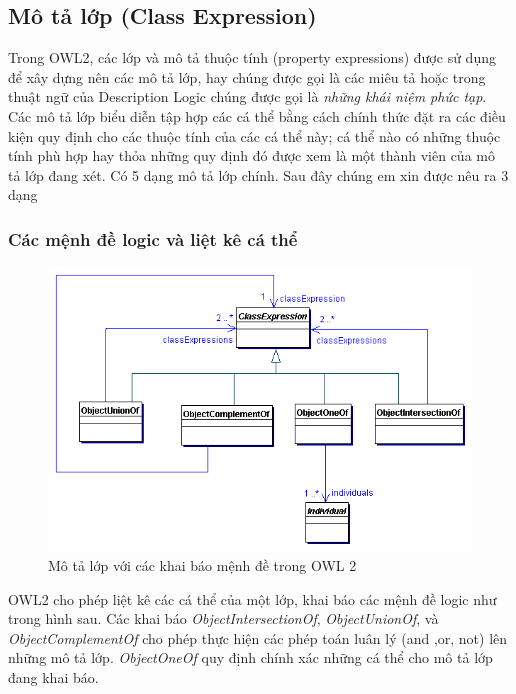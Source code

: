 \subsection{Mô tả lớp (Class Expression)}
Trong OWL2, các lớp và mô tả thuộc tính (property expressions) được sử dụng để xây dựng nên các mô tả lớp, hay chúng được gọi là các miêu tả hoặc trong thuật ngữ của Description Logic chúng được gọi là \textit{những khái niệm phức tạp}. Các mô tả lớp 
biểu diễn tập hợp các cá thể bằng cách chính thức đặt ra các điều kiện quy định cho các thuộc tính của các cá thể này; cá thể nào có những thuộc tính phù hợp hay thỏa những quy định đó được xem là một thành viên của mô tả lớp đang xét. Có 5 dạng mô tả lớp chính. Sau đây chúng em xin được nêu ra 3 dạng 
\subsubsection{Các mệnh đề logic và liệt kê cá thể}
\begin{figure}[h]
	\centering
	\includegraphics[width=150mm]{Figures/ce_0.png}
	\caption{Mô tả lớp với các khai báo mệnh đề trong OWL 2\label{overflow}}
\end{figure}
OWL2 cho phép liệt kê các cá thể của một lớp, khai báo các mệnh đề logic như trong hình sau. Các khai báo \textit{ObjectIntersectionOf}, \textit{ObjectUnionOf}, và \textit{ObjectComplementOf} cho phép thực hiện các phép toán luân lý (and ,or, not) lên những mô tả lớp. \textit{ObjectOneOf} quy định chính xác những cá thể cho mô tả lớp đang khai báo.

